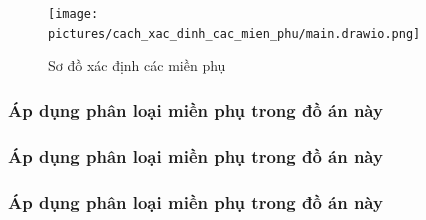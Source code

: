 \begin{figure}[h]

    \centering

    \texttt{[image: pictures/cach\_xac\_dinh\_cac\_mien\_phu/main.drawio.png]}

    \caption{Sơ đồ xác định các miền phụ}

\end{figure}




















\subsubsection{Áp dụng phân loại miền phụ trong đồ án này}

\subsubsection{Áp dụng phân loại miền phụ trong đồ án này}

\subsubsection{Áp dụng phân loại miền phụ trong đồ án này}

